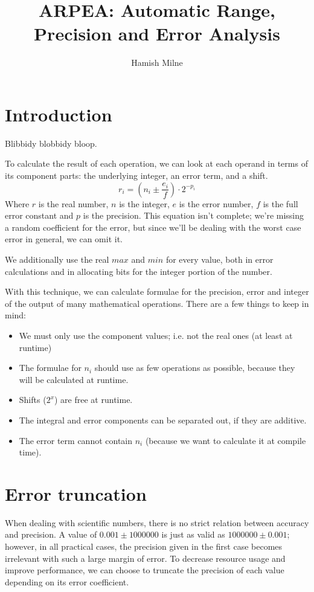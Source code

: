 \documentclass[10pt,a4paper]{article}
\author{Hamish Milne}
\title{ARPEA: Automatic Range, Precision and Error Analysis}
\numberwithin{equation}{section}
\numberwithin{equation}{subsection}
\begin{document}
	
	\maketitle
	
	\section{Introduction}
	
	Blibbidy blobbidy bloop.
	
	To calculate the result of each operation, we can look at each operand in terms of its component parts: the underlying integer, an error term, and a shift.
	\begin{equation}
	r_i = (n_i \pm \frac{e_i}{f})\cdot 2^{-p_i}
	\end{equation}
	Where $r$ is the real number, $n$ is the integer, $e$ is the error number, $f$ is the full error constant and $p$ is the precision. This equation isn't complete; we're missing a random coefficient for the error, but since we'll be dealing with the worst case error in general, we can omit it.
	
	We additionally use the real $max$ and $min$ for every value, both in error calculations and in allocating bits for the integer portion of the number.
	
	With this technique, we can calculate formulae for the precision, error and integer of the output of many mathematical operations. There are a few things to keep in mind:
	\begin{itemize}
		\item We must only use the component values; i.e. not the real ones (at least at runtime)
		\item The formulae for $n_i$ should use as few operations as possible, because they will be calculated at runtime.
		\item Shifts ($2^x$) are free at runtime.
		\item The integral and error components can be separated out, if they are additive.
		\item The error term cannot contain $n_i$ (because we want to calculate it at compile time).
	\end{itemize}
	
	\section{Error truncation}
	
	When dealing with scientific numbers, there is no strict relation between accuracy and precision. A value of $0.001\pm 1000000$ is just as valid as $1000000\pm 0.001$; however, in all practical cases, the precision given in the first case becomes irrelevant with such a large margin of error. To decrease resource usage and improve performance, we can choose to truncate the precision of each value depending on its error coefficient.
	
\end{document}
